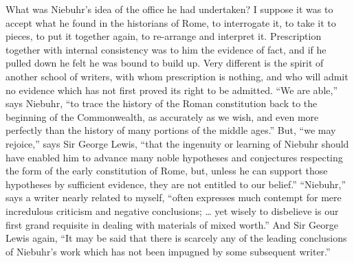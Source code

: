 What was Niebuhr's idea of the office he had undertaken? I suppose
it was to accept what he found in the historians of Rome, to
interrogate it, to take it to pieces, to put it together again, to
re-arrange and interpret it. Prescription together with internal
consistency was to him the evidence of fact, and if he pulled down he
felt he was bound to build up. Very different is the spirit of another
school of writers, with whom prescription is nothing, and who will
admit no evidence which has not first proved its right to be admitted.
``We are able,'' says Niebuhr, ``to trace the history of
the Roman constitution back to the beginning of the Commonwealth, as
accurately as we wish, and even more perfectly than the history of
many portions of the middle ages.'' But, ``we may
rejoice,'' says Sir George Lewis, ``that the ingenuity or
learning of Niebuhr should have enabled him to advance many noble
hypotheses and conjectures respecting the form of the early
constitution of Rome, but, unless he can support those hypotheses by
sufficient evidence, they are not entitled to our belief.'' ``Niebuhr,''
says a writer nearly related to myself, ``often expresses much
contempt for mere incredulous criticism and negative conclusions; …
yet wisely to disbelieve is our first grand requisite in dealing with
materials of mixed worth.'' And Sir George Lewis again, ``It
may be said that there is scarcely any of the leading conclusions of
Niebuhr's work which has not been impugned by some subsequent
writer.''

